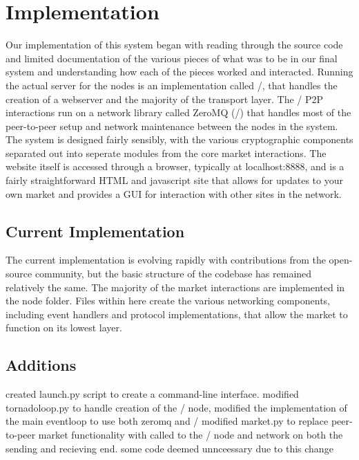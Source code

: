 \documentclass[11pt,twocolumn]{article}
\begin{document}
\section{Implementation}
Our implementation of this system began with reading through the source code and limited documentation of the various pieces of what was to be in our final system and understanding how each of the pieces worked and interacted.
Running the actual server for the nodes is an implementation called \Tornado/, that handles the creation of a webserver and the majority of the transport layer.
The \OpenBazaar/ P2P interactions run on a network library called ZeroMQ (\ZMQ/) that handles most of the peer-to-peer setup and network maintenance between the nodes in the system.
The system is designed fairly sensibly, with the various cryptographic components separated out into seperate modules from the core market interactions.
The website itself is accessed through a browser, typically at {{\sc localhost:8888}}, and is a fairly straightforward HTML and javascript site that allows for updates to your own market and provides a GUI for interaction with other sites in the network.

\subsection{Current Implementation}
The current implementation is evolving rapidly with contributions from the open-source community, but the basic structure of the codebase has remained relatively the same.
The majority of the market interactions are implemented in the node folder.
Files within here create the various networking components, including event handlers and protocol implementations, that allow the market to function on its lowest layer. 

\subsection{Additions}
created launch.py script to create a command-line interface.
modified tornadoloop.py to handle creation of the \Entangled/ node, modified the implementation of the main eventloop to use both zeromq and \Entangled/
modified market.py to replace peer-to-peer market functionality with called to the \Entangled/ node and network on both the sending and recieving end. some code deemed unnceessary due to this change
\end{document}
